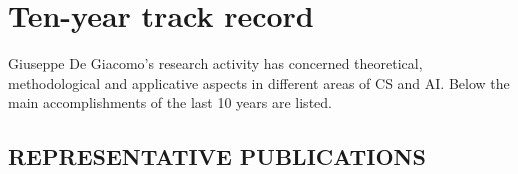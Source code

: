 \section{Ten-year track record}












Giuseppe De Giacomo's research activity has concerned theoretical, methodological and applicative aspects in different areas of CS and AI. Below the main accomplishments of the  last 10 years are listed. 

\subsection*{REPRESENTATIVE PUBLICATIONS}


